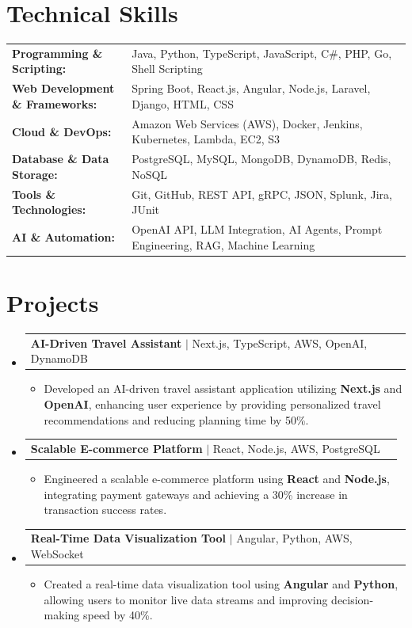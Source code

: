 \documentclass[letterpaper,10pt]{article}
\makeatletter
\newcommand{\resumeItem}[1]{
  \item{\fontsize{8pt}{9pt}\selectfont
    #1 \vspace{-3pt}
  }
}
\newcommand{\resumeProjectHeading}[2]{
    \item
    \begin{tabular*}{1.001\textwidth}{l@{\extracolsep{\fill}}r}
      \fontsize{8.5pt}{10pt}#1 & \textbf{\fontsize{8.5pt}{10pt} #2}\\
    \end{tabular*}\vspace{-7pt}
}
\newcommand{\resumeSubHeadingListStart}{\begin{itemize}[leftmargin=0pt, label={}]}
\newcommand{\resumeSubHeadingListEnd}{\end{itemize}}
\newcommand{\resumeItemListStart}{\begin{itemize}[leftmargin=*]}
\newcommand{\resumeItemListEnd}{\end{itemize}\vspace{-5pt}}
\makeatother
\begin{document}
\section{Technical Skills}
        \vspace{-14pt}
        \begin{table}[h]
            \fontsize{8pt}{9pt}\selectfont
            \begin{tabular}{p{0.3\linewidth} p{0.7\linewidth}}
                \textbf{Programming \& Scripting:} & Java, Python, TypeScript, JavaScript, C\#, PHP, Go, Shell Scripting \\
                \textbf{Web Development \& Frameworks:} & Spring Boot, React.js, Angular, Node.js, Laravel, Django, HTML, CSS \\
                \textbf{Cloud \& DevOps:} & Amazon Web Services (AWS), Docker, Jenkins, Kubernetes, Lambda, EC2, S3 \\
                \textbf{Database \& Data Storage:} & PostgreSQL, MySQL, MongoDB, DynamoDB, Redis, NoSQL \\
                \textbf{Tools \& Technologies:} & Git, GitHub, REST API, gRPC, JSON, Splunk, Jira, JUnit \\
                \textbf{AI \& Automation:} & OpenAI API, LLM Integration, AI Agents, Prompt Engineering, RAG, Machine Learning \\
            \end{tabular}
        \end{table}
 \vspace{-18pt}

\section{Projects}
    \vspace{-5pt}
    \resumeSubHeadingListStart
          \resumeProjectHeading
            {\textbf{AI-Driven Travel Assistant} $|$ Next.js, TypeScript, AWS, OpenAI, DynamoDB}{}
            \resumeItemListStart
                \resumeItem{Developed an AI-driven travel assistant application utilizing \textbf{Next.js} and \textbf{OpenAI}, enhancing user experience by providing personalized travel recommendations and reducing planning time by 50\%.}
            \resumeItemListEnd
        \vspace{-12pt}
    
        \resumeProjectHeading
            {\textbf{Scalable E-commerce Platform} $|$ React, Node.js, AWS, PostgreSQL}{}
        \resumeItemListStart
                \resumeItem{Engineered a scalable e-commerce platform using \textbf{React} and \textbf{Node.js}, integrating payment gateways and achieving a 30\% increase in transaction success rates.}
        \resumeItemListEnd
      \vspace{-12pt}
      \resumeProjectHeading
        {\textbf{Real-Time Data Visualization Tool} $|$ Angular, Python, AWS, WebSocket}{}
    \resumeItemListStart
            \resumeItem{Created a real-time data visualization tool using \textbf{Angular} and \textbf{Python}, allowing users to monitor live data streams and improving decision-making speed by 40\%.}
    \resumeItemListEnd
    \resumeSubHeadingListEnd
\end{document}
